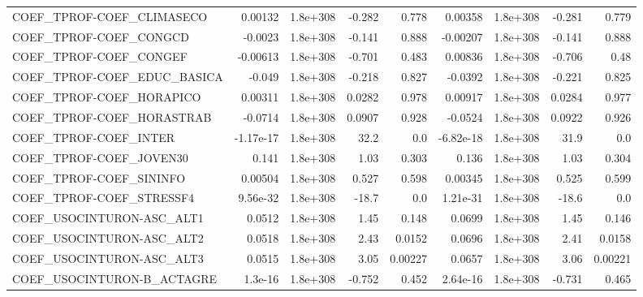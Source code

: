 \begin{tabular}{lrrrrrrrr}
COEF\_TPROF-COEF\_CLIMASECO         &     0.00132 &     1.8e+308 &    -0.282 &    0.778 &    0.00358 &    1.8e+308 &       -0.281 &         0.779 \\
COEF\_TPROF-COEF\_CONGCD            &     -0.0023 &     1.8e+308 &    -0.141 &    0.888 &   -0.00207 &    1.8e+308 &       -0.141 &         0.888 \\
COEF\_TPROF-COEF\_CONGEF            &    -0.00613 &     1.8e+308 &    -0.701 &    0.483 &    0.00836 &    1.8e+308 &       -0.706 &          0.48 \\
COEF\_TPROF-COEF\_EDUC\_BASICA       &      -0.049 &     1.8e+308 &    -0.218 &    0.827 &    -0.0392 &    1.8e+308 &       -0.221 &         0.825 \\
COEF\_TPROF-COEF\_HORAPICO          &     0.00311 &     1.8e+308 &    0.0282 &    0.978 &    0.00917 &    1.8e+308 &       0.0284 &         0.977 \\
COEF\_TPROF-COEF\_HORASTRAB         &     -0.0714 &     1.8e+308 &    0.0907 &    0.928 &    -0.0524 &    1.8e+308 &       0.0922 &         0.926 \\
COEF\_TPROF-COEF\_INTER             &   -1.17e-17 &     1.8e+308 &      32.2 &      0.0 &  -6.82e-18 &    1.8e+308 &         31.9 &           0.0 \\
COEF\_TPROF-COEF\_JOVEN30           &       0.141 &     1.8e+308 &      1.03 &    0.303 &      0.136 &    1.8e+308 &         1.03 &         0.304 \\
COEF\_TPROF-COEF\_SININFO           &     0.00504 &     1.8e+308 &     0.527 &    0.598 &    0.00345 &    1.8e+308 &        0.525 &         0.599 \\
COEF\_TPROF-COEF\_STRESSF4          &    9.56e-32 &     1.8e+308 &     -18.7 &      0.0 &   1.21e-31 &    1.8e+308 &        -18.6 &           0.0 \\
COEF\_USOCINTURON-ASC\_ALT1         &      0.0512 &     1.8e+308 &      1.45 &    0.148 &     0.0699 &    1.8e+308 &         1.45 &         0.146 \\
COEF\_USOCINTURON-ASC\_ALT2         &      0.0518 &     1.8e+308 &      2.43 &   0.0152 &     0.0696 &    1.8e+308 &         2.41 &        0.0158 \\
COEF\_USOCINTURON-ASC\_ALT3         &      0.0515 &     1.8e+308 &      3.05 &  0.00227 &     0.0657 &    1.8e+308 &         3.06 &       0.00221 \\
COEF\_USOCINTURON-B\_ACTAGRE        &     1.3e-16 &     1.8e+308 &    -0.752 &    0.452 &   2.64e-16 &    1.8e+308 &       -0.731 &         0.465 \\

\end{tabular}
